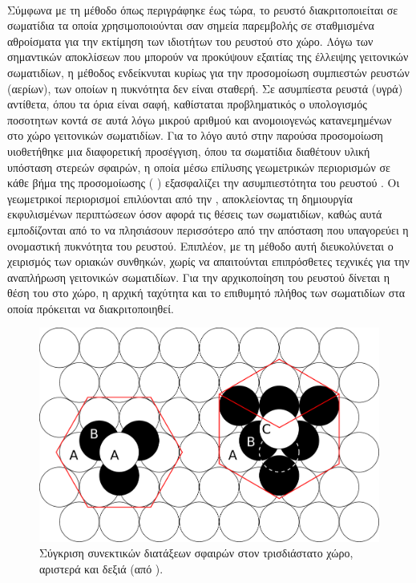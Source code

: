 \paragraph{} Σύμφωνα με τη μέθοδο  όπως περιγράφηκε έως τώρα, το ρευστό
διακριτοποιείται σε σωματίδια τα οποία χρησιμοποιούνται σαν σημεία παρεμβολής σε
σταθμισμένα αθροίσματα για την εκτίμηση των ιδιοτήτων του ρευστού στο χώρο. Λόγω των
σημαντικών αποκλίσεων που μπορούν να προκύψουν εξαιτίας της έλλειψης γειτονικών
σωματιδίων, η μέθοδος ενδείκνυται κυρίως για την προσομοίωση συμπιεστών ρευστών (αερίων),
των οποίων η πυκνότητα δεν είναι σταθερή. Σε ασυμπίεστα ρευστά (υγρά) αντίθετα, όπου τα
όρια είναι σαφή, καθίσταται προβληματικός ο υπολογισμός ποσοτητων κοντά σε αυτά λόγω
μικρού αριθμού και ανομοιογενώς κατανεμημένων στο χώρο γειτονικών σωματιδίων. Για το λόγο
αυτό στην παρούσα προσομοίωση υιοθετήθηκε μια διαφορετική προσέγγιση, όπου τα σωματίδια
διαθέτουν υλική υπόσταση στερεών σφαιρών, η οποία μέσω επίλυσης γεωμετρικών περιορισμών σε
κάθε βήμα της προσομοίωσης ( \cite{Muller2007109})
εξασφαλίζει την ασυμπιεστότητα του ρευστού \cite{macklin2013position}. Οι γεωμετρικοί
περιορισμοί επιλύονται από την , αποκλείοντας τη δημιουργία εκφυλισμένων
περιπτώσεων όσον αφορά τις θέσεις των σωματιδίων, καθώς αυτά εμποδίζονται από το να
πλησιάσουν περισσότερο από την απόσταση που υπαγορεύει η ονομαστική πυκνότητα του
ρευστού. Επιπλέον, με τη μέθοδο αυτή διευκολύνεται ο χειρισμός των οριακών συνθηκών, χωρίς
να απαιτούνται επιπρόσθετες τεχνικές για την αναπλήρωση γειτονικών σωματιδίων. Για την
αρχικοποίηση του ρευστού δίνεται η θέση του στο χώρο, η αρχική ταχύτητα και το επιθυμητό
πλήθος των σωματιδίων στα οποία πρόκειται να διακριτοποιηθεί.

\begin{figure}[]
  \centering
  \includegraphics[width=.9\textwidth]{figures/hcp-fcc.pdf}
  \caption[Συνεκτικές διατάξεις σφαιρών] {Σύγκριση συνεκτικών διατάξεων σφαιρών στον
    τρισδιάστατο χώρο,  αριστερά και  δεξιά (από
    ).}
  \label{fig:hcp-fcc}
\end{figure}


